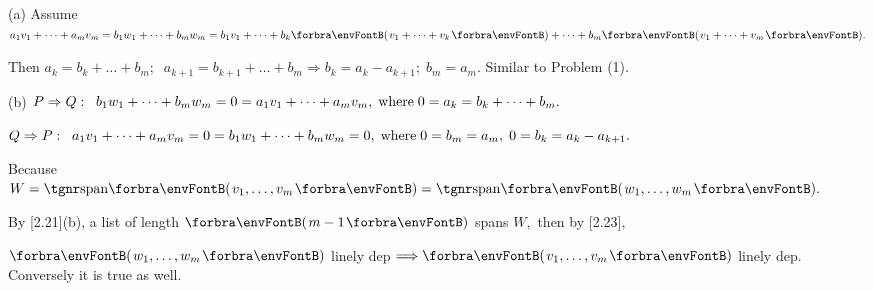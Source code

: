 \par\quad
(a) Assume $a_1v_1+\dots+a_mv_m=b_1w_1+\dots+b_mw_m=b_1v_1+\dots+b_k\Par{v_1+\dots+v_k}+\dots+b_m\Par{v_1+\dots+v_m}.$\par\quad\Ha
Then $a_k=b_k+\dots+b_m;\;\;a_{k+1}=b_{k+1}+\dots+b_m\Rightarrow b_k=a_k-a_{k+1};\;b_m=a_m.$ Similar to Problem (1).\vspace{2pt}\par\quad
(b) $P\Rightarrow Q:\;\;b_1 w_1+\dots+b_m w_m=0=a_1 v_1+\dots+a_m v_m,\text{\;where\;}0=a_k=b_k+\dots+b_m.$\par\quad\Hb
$Q\Rightarrow P:\;\;a_1 v_1+\dots+a_m v_m=0=b_1 w_1+\dots+b_m w_m=0, \text{\;where\;} 0=b_m=a_m,\;0=b_k=a_k-a_{k+1}.$\vspace{4pt}\par\quad\Hb
\Or Because $W=\Span{v_1,\dots,v_m}=\Span{w_1,\dots,w_m}.$\par\quad\Hb
By [2.21](b), a list of length $\Par{m-1}$ spans $W,$ then by [2.23],\par\quad\Hb
$\Par{w_1,\dots,w_m}$ linely dep $\Longrightarrow\Par{v_1,\dots,v_m}$ linely dep. Conversely it is true as well.\PfEnd
\SepLine

